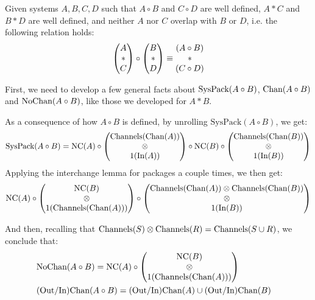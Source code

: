 \begin{lemma}
\label{thm:interchange_system}
Given systems $A, B, C, D$ such that $A \circ B$ and $C \circ D$ are well defined,
$A * C$ and $B * D$ are well defined,
and neither $A$ nor $C$ overlap with $B$ or $D$, i.e.
the following relation holds:
$$
\begin{pmatrix} 
A\cr
*\cr
C\cr
\end{pmatrix} 
\circ
\begin{pmatrix} 
B\cr
*\cr
D\cr
\end{pmatrix} 
\equiv
\begin{matrix} 
  (A \circ B)\cr
*\cr
  (C \circ D)\cr
\end{matrix} 
$$

First, we need to develop a few general facts about $\text{SysPack}(A \circ B)$, $\text{Chan}(A \circ B)$
and $\text{NoChan}(A \circ B)$, like those we developed for $A * B$.

As a consequence of how $A \circ B$ is defined, by unrolling $\text{SysPack}(A \circ B)$,
we get:
$$
  \text{SysPack}(A \circ B) =
  \text{NC}(A) \circ
  \begin{pmatrix}
    \text{Channels}(\text{Chan}(A))\cr
    \otimes\cr
    1(\text{In}(A))
  \end{pmatrix}
  \circ \text{NC}(B) \circ
  \begin{pmatrix}
    \text{Channels}(\text{Chan}(B))\cr
    \otimes\cr
    1(\text{In}(B))
  \end{pmatrix}
$$
Applying the interchange lemma for packages a couple times, we then get:
$$
  \text{NC}(A) \circ
  \begin{pmatrix}
    \text{NC}(B)\cr
    \otimes\cr
    1(\text{Channels}(\text{Chan}(A)))
  \end{pmatrix}
  \circ
  \begin{pmatrix}
    \text{Channels}(\text{Chan}(A)) \otimes \text{Channels}(\text{Chan}(B))\cr
    \otimes\cr
    1(\text{In}(B))
  \end{pmatrix}
$$

And then, recalling
that $\text{Channels}(S) \otimes \text{Channels}(R) = \text{Channels}(S \cup R)$,
we conclude that:
$$
\begin{aligned}
  &\text{NoChan}(A \circ B) =
  \text{NC}(A) \circ
  \begin{pmatrix}
    \text{NC}(B)\cr
    \otimes\cr
    1(\text{Channels}(\text{Chan}(A)))
  \end{pmatrix}
  \cr
  &\text{(Out/In)Chan}(A \circ B) = \text{(Out/In)Chan}(A) \cup \text{(Out/In)Chan}(B)\cr
\end{aligned}
$$


\end{lemma}
